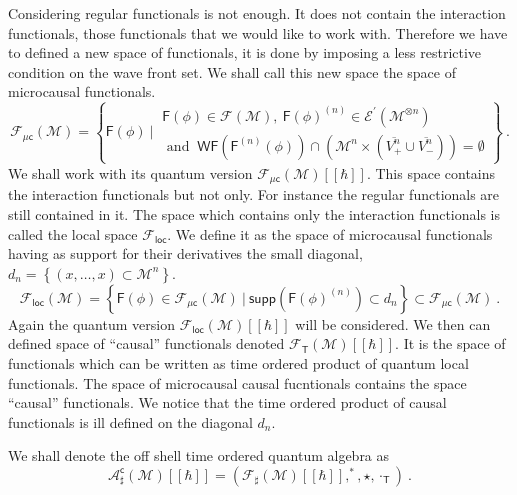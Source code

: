 \documentclass[10pt]{book}
\newcommand{\supp}{\mathsf{supp}}
\newcommand{\WF}{\mathsf{WF}}
\newcommand{\Acal}{\mathcal{A}}
\newcommand{\Ecal}{\mathcal{E}}
\newcommand{\Fcal}{\mathcal{F}}
\newcommand{\Mcal}{\mathcal{M}}
\newcommand{\Fsf}{\mathsf{F}}
\newcommand{\Tsf}{\mathsf{T}}
\newcommand{\csf}{\mathsf{c}}
\theoremstyle{break}
\begin{document}
Considering regular functionals is not enough. It does not contain the interaction functionals, those functionals that we would like to work with. Therefore we have to defined a new space of functionals, it is done by imposing a less restrictive condition on the wave front set. We shall call this new space the space of microcausal functionals.
%
\begin{equation*}
\Fcal_{\mu\csf}(\Mcal) = \left\{ 
\Fsf(\phi) \ \bigg| \ 
\begin{array}{l}
\Fsf(\phi) \in \Fcal(\Mcal), \ \Fsf(\phi)^{(n)} \in \Ecal^\prime(\Mcal^{\otimes n}) \\
\mbox{ and } \ \WF(\Fsf^{(n)}(\phi)) \cap \left( \Mcal^n \times ( \overline{V^{n}_{+}} \cup \overline{V^{n}_{-}} ) \right)  = \emptyset 
\end{array}
\right\} \ .
\end{equation*}
%
We shall work with its quantum version $\Fcal_{\mu\csf}(\Mcal)[[\hbar]]$. This space contains the interaction functionals but not only. For instance the regular functionals are still contained in it. The space which contains only the interaction functionals is called the local space $\mathcal{F}_\mathsf{loc}$. We define it as the space of microcausal functionals having as support for their derivatives the small diagonal, $d_n = \left\{ (x,\dots,x) \subset \Mcal^n \right\}$.
%
\begin{equation*}
\Fcal_{\mathsf{loc}}(\Mcal) = \left\{ \Fsf(\phi) \in \Fcal_{\mu\csf}(\Mcal) \ \bigg| \ \supp\left(\Fsf(\phi)^{(n)}\right) \subset d_n \right\} \subset \Fcal_{\mu\csf}(\Mcal) \ .
\end{equation*}
%
Again the quantum version $\Fcal_{\mathsf{loc}}(\Mcal)[[\hbar]]$ will be considered. We then can defined space of ``causal'' functionals denoted $\Fcal_\Tsf(\Mcal)[[\hbar]]$. It is the space of functionals which can be written as time ordered product of quantum local functionals. The space of microcausal causal fucntionals contains the space ``causal'' functionals. We notice that the time ordered product of causal functionals is ill defined on the diagonal $d_n$.


\bigskip


We shall denote the off shell time ordered quantum algebra as
%
\begin{equation*}
\Acal_\sharp^\csf(\Mcal)[[\hbar]] = \left( \Fcal_\sharp(\Mcal)[[\hbar]] , ^\ast , \star , \cdot_\Tsf \right) \ . 
\end{equation*}


\bigskip
\end{document}
